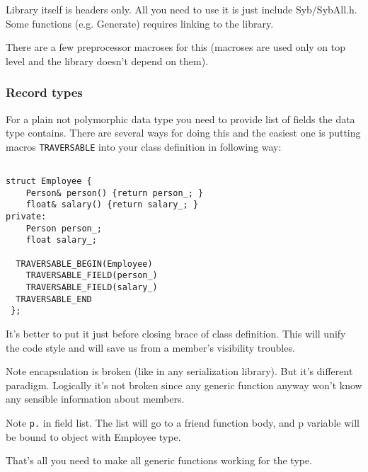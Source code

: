 \documentclass[a4paper]{article}
\begin{document}
Library itself is headers only. All you need to use it is just include Syb/SybAll.h.
Some functions (e.g. Generate) requires linking to the library.

There are a few preprocessor macroses for this (macroses are used only on top level
and the library doesn't depend on them). 

\subsubsection{Record types}

For a plain not polymorphic data type you need to provide list of fields the data
type contains. There are several ways for doing this and the easiest one is 
putting macros \lstinline{TRAVERSABLE} into your class definition in following way:

\begin{lstlisting}

struct Employee {
	Person& person() {return person_; }
	float& salary() {return salary_; }
private:
	Person person_;
	float salary_;

  TRAVERSABLE_BEGIN(Employee)
    TRAVERSABLE_FIELD(person_)
    TRAVERSABLE_FIELD(salary_)
  TRAVERSABLE_END
 };

\end{lstlisting}

It's better to put it just before closing brace of class definition. This will unify
the code style and will save us from a member's visibility troubles.

Note encapsulation is broken (like in any serialization library). But it's different 
paradigm. Logically it's not broken since any generic function anyway won't know 
any sensible information about members.

Note \lstinline{p.} in field list. The list will go to a friend function body, and 
p variable will be bound to object with Employee type.

That's all you need to make all generic functions working for the type.
\end{document}
